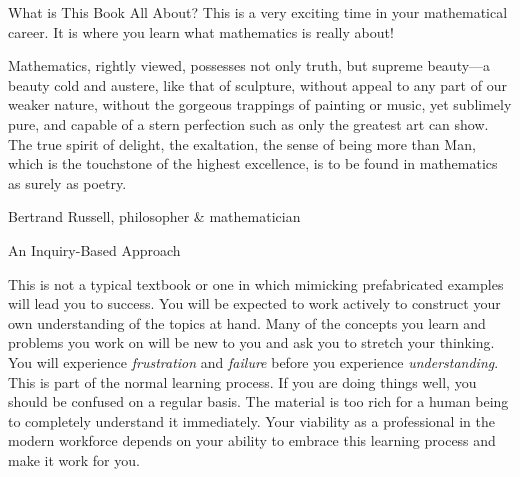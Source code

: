 \begin{section}{What is This Book All About?}
This is a very exciting time in your mathematical career.  It is where you learn what mathematics is really about!

\epigraph{Mathematics, rightly viewed, possesses not only truth, but supreme beauty---a beauty cold and austere, like that of sculpture, without appeal to any part of our weaker nature, without the gorgeous trappings of painting or music, yet sublimely pure, and capable of a stern perfection such as only the greatest art can show. The true spirit of delight, the exaltation, the sense of being more than Man, which is the touchstone of the highest excellence, is to be found in mathematics as surely as poetry.}{Bertrand Russell, philosopher \& mathematician}

\end{section}

\begin{section}{An Inquiry-Based Approach}

This is not a typical textbook or one in which mimicking prefabricated examples will lead you to success. You will be expected to work actively to construct your own understanding of the topics at hand. Many of the concepts you learn and problems you work on will be new to you and ask you to stretch your thinking. You will experience \emph{frustration} and \emph{failure} before you experience \emph{understanding}. This is part of the normal learning process. If you are doing things well, you should be confused on a regular basis. The material is too rich for a human being to completely understand it immediately. Your viability as a professional in the modern workforce depends on your ability to embrace this learning process and make it work for you.



\end{section}
